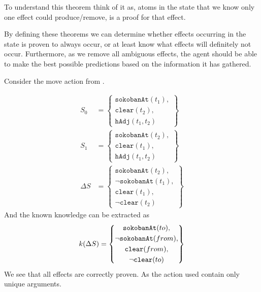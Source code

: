\documentclass[../Master.tex]{subfiles}
\begin{document}
To understand this theorem think of it as, atoms in the state that we know only one effect could produce/remove, is a proof for that effect.

By defining these theorems we can determine whether effects occurring in the state is proven to always occur, or at least 
know what effects will definitely not occur. Furthermore, as we remove all ambiguous effects, the agent should be able to make the best possible predictions based on the information it has gathered.

\begin{example} \label{ex:nca:moveSucceeded-proving-effects}
	Consider the move action from .	
	
	\begin{align*}
		S_0 &=
		\left\{
		\begin{gathered}
			\texttt{sokobanAt}(t_1), \\
			\texttt{clear}(t_2), \\
			\texttt{hAdj}(t_1, t_2)			
		\end{gathered}
		\right\} \\	
		S_1 &=
		\left\{
		\begin{gathered}
			\texttt{sokobanAt}(t_2), \\
			\texttt{clear}(t_1), \\
			\texttt{hAdj}(t_1, t_2)			
		\end{gathered}
		\right\} \\				
	\Delta S &= \left\{
        \begin{gathered}
            \texttt{sokobanAt}(t_2), \\
            \neg  \texttt{sokobanAt}(t_1), \\
            \texttt{clear}(t_1), \\
            \neg \texttt{clear}(t_2)		
        \end{gathered}
        \right\}
	\end{align*}
And the known knowledge can be extracted as
    \begin{equation*}
        k(\Delta S) = \left\{
            \begin{gathered}
               \texttt{sokobanAt}(to), \\
               \neg  \texttt{sokobanAt}(from), \\
               \texttt{clear}(from), \\
               \neg \texttt{clear}(to)		
            \end{gathered}
        \right\}
    \end{equation*}
	We see that all effects are correctly proven. As the action used contain only unique arguments.
\end{example}
\end{document}
